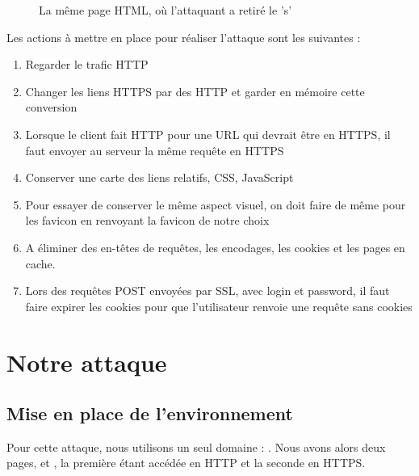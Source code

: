\begin{figure}[H]
  \caption{La même page HTML, où l'attaquant a retiré le 's'}
\end{figure}

Les actions à mettre en place pour réaliser l'attaque sont les suivantes :

\begin{enumerate}
\item Regarder le trafic HTTP
\item Changer les liens HTTPS par des HTTP et garder en mémoire cette conversion
\item Lorsque le client fait HTTP pour une URL qui devrait être en HTTPS, il faut envoyer au serveur la même requête en HTTPS
\item Conserver une carte des liens relatifs, CSS, JavaScript
\item Pour essayer de conserver le même aspect visuel, on doit faire de même pour les favicon en renvoyant la favicon de notre choix
\item A éliminer des en-têtes de requêtes, les encodages, les cookies et les pages en cache.
\item Lors des requêtes POST envoyées par SSL, avec login et password, il faut faire expirer les cookies pour que l'utilisateur renvoie une requête sans cookies
\end{enumerate}

\section{Notre attaque}

\subsection{Mise en place de l'environnement}

Pour cette attaque, nous utilisons un seul domaine : . Nous avons alors deux pages,  et , la première étant accédée en HTTP et la seconde en HTTPS.

